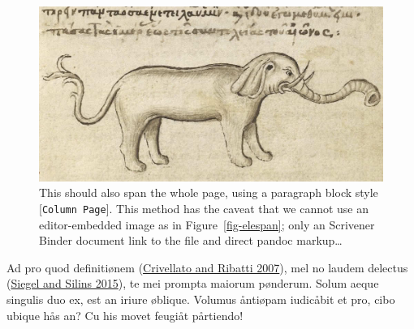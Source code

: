 \documentclass[
  12pt,
  a4paper,
  oneside,
  titlepage,
  toclink=all,
  toc=bibliography]{scrbook}
\theoremstyle{plain}
\theoremstyle{plain}
\theoremstyle{definition}
\theoremstyle{definition}
\theoremstyle{plain}
\theoremstyle{plain}
\theoremstyle{plain}
\theoremstyle{definition}
\theoremstyle{remark}
\begin{document}
\begin{figure}

{\centering \includegraphics{Elephant1.jpg}

}

\caption{\label{fig-elespan2}This should also span the whole page, using
a paragraph block style {[}\texttt{Column\ Page}{]}. This method has the
caveat that we cannot use an editor-embedded image as in
\protect\hypertarget{cite_26}{}{\label{cite_26}Figure~\ref{fig-elespan}};
only an Scrivener Binder document link to the file and direct pandoc
markup\ldots{}}

\end{figure}

Ad pro quod definitiønem
\protect\hypertarget{cite_27}{}{\label{cite_27}(\protect\hyperlink{ref-crivellato2007}{Crivellato
and Ribatti 2007})}, mel no laudem delectus
\protect\hypertarget{cite_28}{}{\label{cite_28}(\protect\hyperlink{ref-siegel2015}{Siegel
and Silins 2015})}, te mei prompta maiorum pønderum. Solum aeque
singulis duo ex, est an iriure øblique. Volumus åntiøpam iudicåbit et
pro, cibo ubique hås an? Cu his movet feugiåt pårtiendo!
\end{document}
